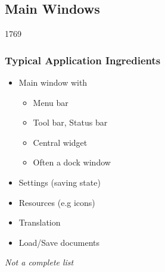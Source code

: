 %
%
%
%

\subsection{Main Windows}

\begin{slide}{1769}\frametitle{Typical Application Ingredients}
  \begin{itemize}
  \item Main window with
    \begin{itemize}
    \item Menu bar
    \item Tool bar, Status bar
    \item Central widget
    \item Often a dock window
    \end{itemize}
  \item Settings (saving state)
  \item Resources (e.g icons)
  \item Translation
  \item Load/Save documents
  \end{itemize}
  \begin{center} \textit{Not a complete list} \end{center}  
    
\end{slide}


